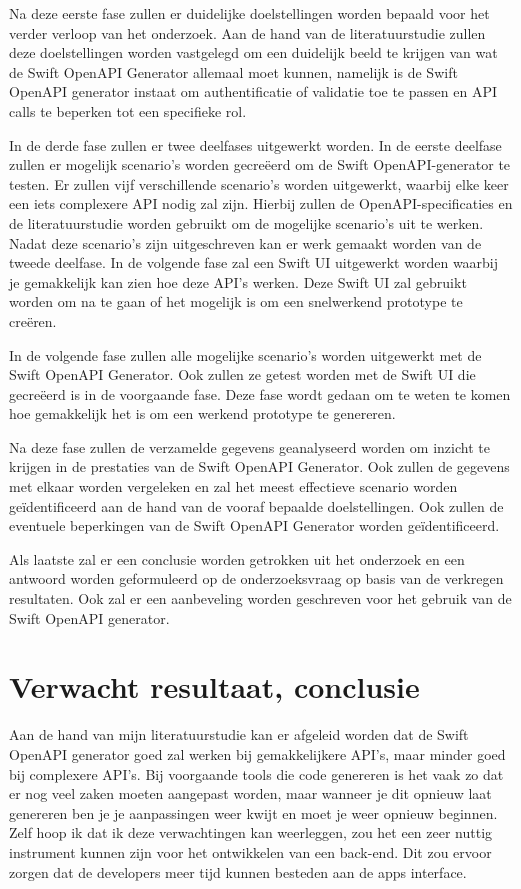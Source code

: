 Na deze eerste fase zullen er duidelijke doelstellingen worden bepaald voor het verder verloop van het onderzoek. Aan de hand van de literatuurstudie zullen deze doelstellingen worden vastgelegd om een duidelijk beeld te krijgen van wat de Swift OpenAPI Generator allemaal moet kunnen, namelijk is de Swift OpenAPI generator instaat om authentificatie of validatie toe te passen en API calls te beperken tot een specifieke rol. 

In de derde fase zullen er twee deelfases uitgewerkt worden. In de eerste deelfase zullen er mogelijk scenario's worden gecreëerd om de Swift OpenAPI-generator te testen. Er zullen vijf verschillende scenario's worden uitgewerkt, waarbij elke keer een iets complexere API nodig zal zijn. Hierbij zullen de OpenAPI-specificaties en de literatuurstudie worden gebruikt om de mogelijke scenario's uit te werken. Nadat deze scenario’s zijn uitgeschreven kan er werk gemaakt worden van de tweede deelfase. In de volgende fase zal een Swift UI uitgewerkt worden waarbij je gemakkelijk kan zien hoe deze API’s werken. Deze Swift UI zal gebruikt worden om na te gaan of het mogelijk is om een snelwerkend prototype te creëren. 

In de volgende fase zullen alle mogelijke scenario’s worden uitgewerkt met de Swift OpenAPI Generator. Ook zullen ze getest worden met de Swift UI die gecreëerd is in de voorgaande fase. Deze fase wordt gedaan om te weten te komen hoe gemakkelijk het is om een werkend prototype te genereren. 

Na deze fase zullen de verzamelde gegevens geanalyseerd worden om inzicht te krijgen in de prestaties van de Swift OpenAPI Generator. Ook zullen de gegevens met elkaar worden vergeleken en zal het meest effectieve scenario worden geïdentificeerd aan de hand van de vooraf bepaalde doelstellingen. Ook zullen de eventuele beperkingen van de Swift OpenAPI Generator worden geïdentificeerd.

Als laatste zal er een conclusie worden getrokken uit het onderzoek en een antwoord worden geformuleerd op de onderzoeksvraag op basis van de verkregen resultaten. Ook zal er een aanbeveling worden geschreven voor het gebruik van de Swift OpenAPI generator. 



\section{Verwacht resultaat, conclusie}%
\label{sec:verwachte_resultaten}

Aan de hand van mijn literatuurstudie kan er afgeleid worden dat de Swift OpenAPI generator goed zal werken bij gemakkelijkere API’s, maar minder goed bij complexere API’s. Bij voorgaande tools die code genereren is het vaak zo dat er nog veel zaken moeten aangepast worden, maar wanneer je dit opnieuw laat genereren ben je je aanpassingen weer kwijt en moet je weer opnieuw beginnen. Zelf hoop ik dat ik deze verwachtingen kan weerleggen, zou het een zeer nuttig instrument kunnen zijn voor het ontwikkelen van een back-end. Dit zou ervoor zorgen dat de developers meer tijd kunnen besteden aan de apps interface. 
